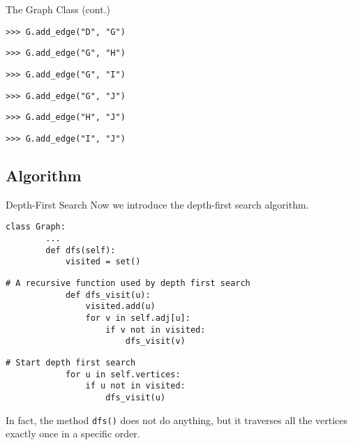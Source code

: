 \documentclass{beamer}
\begin{document}
\begin{frame}[fragile]{The Graph Class (cont.)}
\begin{block}{}
\begin{lstlisting}[gobble=4]
    >>> G.add_edge("D", "G")
    \end{lstlisting}
    \pause
    \begin{lstlisting}[gobble=4]
    >>> G.add_edge("G", "H")
    \end{lstlisting}
    \pause
    \begin{lstlisting}[gobble=4]
    >>> G.add_edge("G", "I")
    \end{lstlisting}
    \pause
    \begin{lstlisting}[gobble=4]
    >>> G.add_edge("G", "J")
    \end{lstlisting}
    \pause
    \begin{lstlisting}[gobble=4]
    >>> G.add_edge("H", "J")
    \end{lstlisting}
    \pause
    \begin{lstlisting}[gobble=4]
    >>> G.add_edge("I", "J")
    \end{lstlisting}
  \end{block}
\end{frame}

\subsection{Algorithm}
\begin{frame}[fragile]{Depth-First Search}
  Now we introduce the depth-first search algorithm. \pause
  \begin{block}{}
    \scriptsize
    \begin{lstlisting}[gobble=4]
    class Graph:
        ...
        def dfs(self):
            visited = set()
    \end{lstlisting}
    \pause
    \begin{lstlisting}[gobble=4]
            # A recursive function used by depth first search
            def dfs_visit(u):
                visited.add(u)
                for v in self.adj[u]:
                    if v not in visited:
                        dfs_visit(v)
    \end{lstlisting}
    \pause
    \begin{lstlisting}[gobble=4]
            # Start depth first search
            for u in self.vertices:
                if u not in visited:
                    dfs_visit(u)
    \end{lstlisting}
  \end{block}
  \pause
  In fact, the method \lstinline{dfs()} does not do anything, but it traverses
  all the vertices exactly once in a specific order.
\end{frame}
\end{document}
